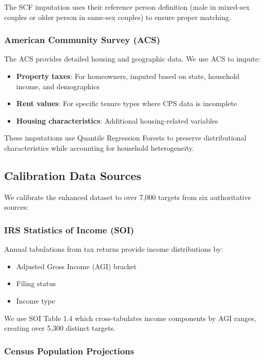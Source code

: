 The SCF imputation uses their reference person definition (male in mixed-sex couples or older person in same-sex couples) to ensure proper matching.

\subsubsection{American Community Survey (ACS)}

The ACS provides detailed housing and geographic data. We use ACS to impute:
\begin{itemize}
\item \textbf{Property taxes}: For homeowners, imputed based on state, household income, and demographics
\item \textbf{Rent values}: For specific tenure types where CPS data is incomplete
\item \textbf{Housing characteristics}: Additional housing-related variables
\end{itemize}

These imputations use Quantile Regression Forests to preserve distributional characteristics while accounting for household heterogeneity.

\subsection{Calibration Data Sources}

We calibrate the enhanced dataset to over 7,000 targets from six authoritative sources:

\subsubsection{IRS Statistics of Income (SOI)}

Annual tabulations from tax returns provide income distributions by:
\begin{itemize}
\item Adjusted Gross Income (AGI) bracket
\item Filing status
\item Income type
\end{itemize}

We use SOI Table 1.4 which cross-tabulates income components by AGI ranges, creating over 5,300 distinct targets.

\subsubsection{Census Population Projections}


